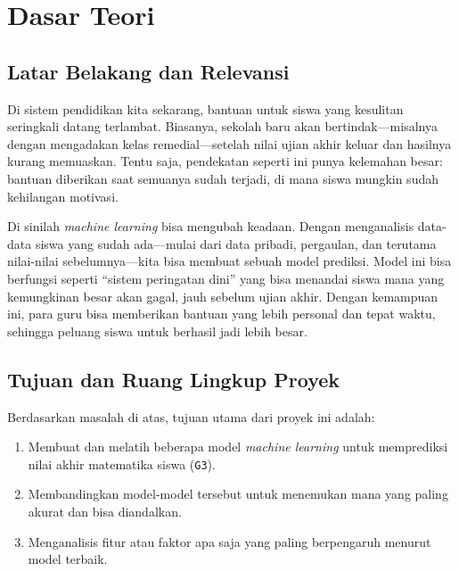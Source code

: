 \chapter*{Dasar Teori}

\section{Latar Belakang dan Relevansi}

Di sistem pendidikan kita sekarang, bantuan untuk siswa yang kesulitan seringkali datang terlambat. Biasanya, sekolah baru akan bertindak---misalnya dengan mengadakan kelas remedial---setelah nilai ujian akhir keluar dan hasilnya kurang memuaskan. Tentu saja, pendekatan seperti ini punya kelemahan besar: bantuan diberikan saat semuanya sudah terjadi, di mana siswa mungkin sudah kehilangan motivasi.

Di sinilah \textit{machine learning} bisa mengubah keadaan. Dengan menganalisis data-data siswa yang sudah ada---mulai dari data pribadi, pergaulan, dan terutama nilai-nilai sebelumnya---kita bisa membuat sebuah model prediksi. Model ini bisa berfungsi seperti ``sistem peringatan dini'' yang bisa menandai siswa mana yang kemungkinan besar akan gagal, jauh sebelum ujian akhir. Dengan kemampuan ini, para guru bisa memberikan bantuan yang lebih personal dan tepat waktu, sehingga peluang siswa untuk berhasil jadi lebih besar.

\section{Tujuan dan Ruang Lingkup Proyek}

Berdasarkan masalah di atas, tujuan utama dari proyek ini adalah:
\begin{enumerate}
    \item Membuat dan melatih beberapa model \textit{machine learning} untuk memprediksi nilai akhir matematika siswa (\texttt{G3}).
    \item Membandingkan model-model tersebut untuk menemukan mana yang paling akurat dan bisa diandalkan.
    \item Menganalisis fitur atau faktor apa saja yang paling berpengaruh menurut model terbaik.
\end{enumerate}


